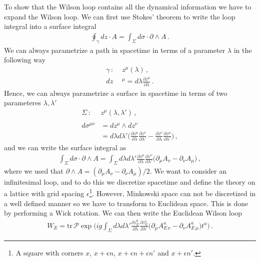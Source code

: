 To show that the Wilson loop contains all the dynamical information we have to expand the Wilson loop. We can first use Stokes' theorem to write the loop integral into a surface integral
\begin{align}
    \oint_{\gamma}dz\cdot A=\int_{\Sigma}d\sigma\cdot\partial\wedge A\,.
\end{align}
We can always parametrize a path in spacetime in terms of a parameter $\lambda$ in the following way
\begin{align}\label{eq:path parametrization}
    \gamma\,:\,\,&z^{\mu}(\lambda)\,,
    \\
    dz&^{\mu}=d\lambda\frac{\partial z^{\mu}}{\partial\lambda}\,.
\end{align}
Hence, we can always parametrize a surface in spacetime in terms of two parameteres $\lambda,\lambda'$
\begin{align}
    \Sigma\,:\,\,&z^{\mu}(\lambda,\lambda')\,,
    \\
    \nonumber
    \\
    d\sigma^{\mu\nu}&=dz^{\mu}\wedge dz^{\nu}\nonumber
    \\
    &=d\lambda d\lambda'\Big(\frac{\partial z^{\mu}}{\partial\lambda}\frac{\partial z^{\nu}}{\partial\lambda'}-\frac{\partial z^{\nu}}{\partial\lambda}\frac{\partial z^{\mu}}{\partial\lambda'}\Big)\,,
\end{align}
and we can write the surface integral as
\begin{align}
    \int_{\Sigma}d\sigma\cdot\partial\wedge A=\int_{\Sigma}d\lambda d\lambda'\frac{\partial z^{\mu}}{\partial\lambda}\frac{\partial z^{\nu}}{\partial\lambda'}\big(\partial_{\mu}A_{\nu}-\partial_{\nu}A_{\mu}\big)\,,
\end{align}
where we used that $\partial \wedge A=(\partial_{\mu}A_{\nu}-\partial_{\nu}A_{\mu})/2$. We want to consider an infinitesimal loop, and to do this we discretize spacetime and define the theory on a lattice with grid spacing $\epsilon$\footnote{A square with corners $x$, $x+\epsilon n$, $x+\epsilon n+\epsilon n'$ and $x+\epsilon n'$.}. However, Minkowski space can not be discretized in a well defined manner so we have to transform to Euclidean space. This is done by performing a Wick rotation. We can then write the Euclidean Wilson loop
\begin{align}
    W_{E}=\text{tr}\,\mathcal{P}\exp\Big(ig\int_{\Sigma}d\lambda d\lambda'\frac{\partial z_{E}^{\mu}}{\partial \lambda}\frac{\partial z_{E}^{\nu}}{\partial\lambda'}\big(\partial_{\mu}A_{E\,\nu}^{a}-\partial_{\nu}A_{E\,\mu}^{a}\big)t^{a}\Big)\,.
\end{align}
